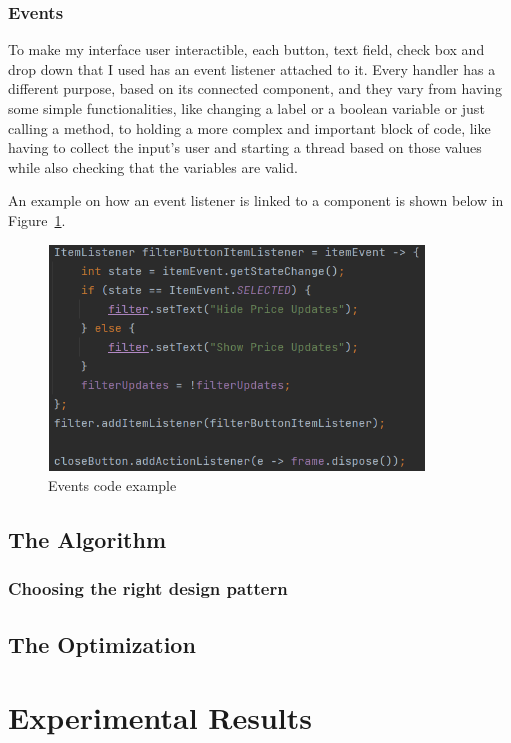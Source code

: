 \documentclass[12pt,a4paper]{report}
\begin{document}
\subsection{Events}
To make my interface user interactible, each button, text field, check box and drop down that I used has an event listener attached to it. Every handler has a different purpose, based on its connected component, and they vary from having some simple functionalities, like changing a label or a boolean variable or just calling a method, to holding a more complex and important block of code, like having to collect the input's user and starting a thread based on those values while also checking that the variables are valid.  

An example on how an event listener is linked to a component is shown below in Figure~\ref{fig:events}.

\begin{figure}[!ht]
	\centering
	\includegraphics[width=10cm,height=6cm]{pics/events.png}
	\caption{Events code example}
	\label{fig:events}
\end{figure}

\section{The Algorithm}

\subsection{Choosing the right design pattern}

\section{The Optimization}

\chapter{Experimental Results}
\end{document}
